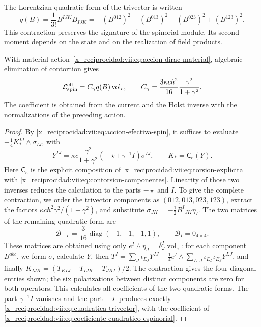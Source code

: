 The Lorentzian quadratic form of the trivector is written
\begin{equation}
 q(B)=\frac1{3!}B^{IJK}B_{IJK}
 =-(B^{012})^2-(B^{013})^2-(B^{023})^2+(B^{123})^2.
 \label{x_reciprocidad:vii:eq:cuadratica-trivector}
\end{equation}
This contraction preserves the signature of the spinorial module. Its second
moment depends on the state and on the realization of field
products.

\begin{theorem}
\label{x_reciprocidad:vii:thm:coeficiente-torsional-espinorial}
With material action~\eqref{x_reciprocidad:vii:eq:accion-dirac-material}, algebraic
elimination of contortion gives
\begin{equation}
 \mathcal L_{\rm spin}^{\rm eff}
 =C_\gamma q(B)\operatorname{vol}_e,\qquad
 C_\gamma=\frac{3\kappa c\hbar^2}{16}
                      \frac{\gamma^2}{1+\gamma^2}.
 \label{x_reciprocidad:vii:eq:coeficiente-cuadratico-espinorial}
\end{equation}
The coefficient is obtained from the current and the Holst inverse
with the normalizations of the preceding action.
\end{theorem}
\begin{proof}
By \eqref{x_reciprocidad:vii:eq:accion-efectiva-spin}, it suffices to evaluate
\(-\frac14K_*^{IJ}\wedge\sigma_{IJ}\), with
\[
 Y^{IJ}=\kappa c\frac{\gamma^2}{1+\gamma^2}
           (-\star+\gamma^{-1}I)\sigma^{IJ},\qquad
 K_*=\mathsf C_e(Y).
\]
Here \(\mathsf C_e\) is the explicit composition of
\eqref{x_reciprocidad:vii:eq:torsion-explicita} with
\eqref{x_reciprocidad:vii:eq:contorsion-componentes}. Linearity of those two
inverses reduces the calculation to the parts \(-\star\) and \(I\).
To give the complete contraction, we order the trivector
components as \((012,013,023,123)\), extract the factors
\(\kappa c\hbar^2\gamma^2/(1+\gamma^2)\), and substitute
\(\sigma_{JK}=-\frac12B^I{}_{JK}\eta_I\). The two matrices
of the remaining quadratic form are
\begin{equation}
 \mathcal B_{-\star}
 =\frac3{16}\operatorname{diag}(-1,-1,-1,1),\qquad
 \mathcal B_I=0_{4\times4}.
 \label{x_reciprocidad:vii:eq:matrices-contraccion-espinorial}
\end{equation}
These matrices are obtained using only
\(e^I\wedge\eta_J=\delta_J^I\operatorname{vol}_e\): for
each component \(B^{abc}\), we form \(\sigma\), calculate
\(Y\), then
\(T^I=\sum_J\iota_{E_J}Y^{IJ}
 -\frac14e^I\wedge\sum_{L,J}\iota_{E_L}\iota_{E_J}Y^{LJ}\),
and finally
\(K_{IJK}=(T_{KIJ}-T_{IJK}-T_{JKI})/2\).
The contraction gives the four diagonal entries shown; the
six polarizations between distinct components are zero for both
operators. This calculates all coefficients of the two
quadratic forms. The part \(\gamma^{-1}I\) vanishes and the part
\(-\star\) produces exactly \eqref{x_reciprocidad:vii:eq:cuadratica-trivector},
with the coefficient of \eqref{x_reciprocidad:vii:eq:coeficiente-cuadratico-espinorial}.
\end{proof}

